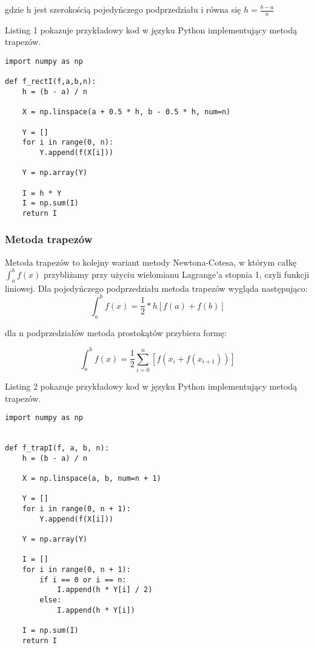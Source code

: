 \documentclass[12pt,twoside]{article}
\begin{document}
gdzie h jest szerokością pojedyńczego podprzedziału i równa się $h = \frac{b-a}{n}$  \cite{rect}

Listing 1 pokazuje przykładowy kod w języku Python implementujący metodą trapezów.
\begin{lstlisting}[caption={Kod w języku python implementujący metodę prostokątów}]
import numpy as np

def f_rectI(f,a,b,n):
    h = (b - a) / n

    X = np.linspace(a + 0.5 * h, b - 0.5 * h, num=n)

    Y = []
    for i in range(0, n):
        Y.append(f(X[i]))

    Y = np.array(Y)

    I = h * Y
    I = np.sum(I)
    return I
\end{lstlisting}
\label{Listing 1}



\subsubsection{Metoda trapezów}
Metoda trapezów to kolejny wariant metody Newtona-Cotesa, w którym całkę $\int_a^b f(x)$ przybliżamy przy użyciu wielomianu Lagrange'a stopnia 1, czyli funkcji liniowej.
Dla pojedyńczego podprzedziału metoda trapezów wygląda następująco:
\begin{equation}
\int_a^b f(x) =  \frac{1}{2}*h[f(a) + f(b)]
\label{Eq:rownanie}
\end{equation}

dla n podprzedziałów metoda prostokątów przybiera formę:

\begin{equation}
\int_a^b f(x) =  \frac{1}{2}\sum_{i=0}^n[f(x_i + f(x_{i+1}))] 
\label{Eq:rownanie}
\end{equation}

Listing 2 pokazuje przykładowy kod w języku Python implementujący metodą trapezów.

\begin{lstlisting}[caption={Kod w języku python implementujący metodę trapezów}]
import numpy as np


def f_trapI(f, a, b, n):
    h = (b - a) / n

    X = np.linspace(a, b, num=n + 1)

    Y = []
    for i in range(0, n + 1):
        Y.append(f(X[i]))

    Y = np.array(Y)

    I = []
    for i in range(0, n + 1):
        if i == 0 or i == n:
            I.append(h * Y[i] / 2)
        else:
            I.append(h * Y[i])

    I = np.sum(I)
    return I

\end{lstlisting}
\label{Listing 2}
\end{document}
